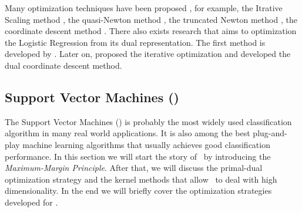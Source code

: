 {Many optimization techniques have been proposed \citep{Minka03}, for example, 
the {Itrative Scaling} method \citep{Darroch72,Pietra97inducing,Berger97,Goodman02Sequential,Jin03a},
the quasi-Newton method \citep{Minka03},
the truncated Newton method \citep{Komarek05making,Lin2008trust},
the coordinate descent method \citep{Huang09iterative}.
There also exists research that aims to optimization the Logistic Regression from its dual representation.
The first method is developed by \citet{Jaakkola99probabilistic}.
Later on, \citet{Keerthi05a} proposed the iterative optimization and \citet{Yu11dual} developed the dual coordinate descent method.




\iffalse
The key is to introduce a set of tighter upper bounds on (\ref{lr_posteriori_log}) that are parameterized by $\valpha$.
The bounds should have a simple form such that the maximizing (\ref{lr_posteriori_log}) over $\vw$ can be solved analytically with $\alpha$.
The solution to the original problem is transferred as finding the tighter upper bounds for  $\vw$, which is to minimize with respect to $\alpha$.
\iffalse
The dual form is given by 
\begin{align*}
	\underset{\valpha}{\minimize} & \quad\frac{1}{2}\sum_{i=1}^{m}\sum_{j=1}^{m}\valpha_iy_ix_ix_jy_j\valpha_j + \sum_{i=1}^{m}\left[\valpha_i\log\alpha_i+(\sigma^2-\valpha_i)\log(\sigma^2-\valpha_i)\right] \\
	\st &\quad 0\le\alpha\le\sigma^2, \, \forall i=\{1,\cdots,m\}.
\end{align*}
\fi
Later on, optimization algorithms that are based on dual form have been developed, for example iterative optimization method \citep{Keerthi05a} and the dual coordinate descent method \citep{Yu11dual}.
\fi


%
% 
\subsection{Support Vector Machines (\svm)}	\label{sc_svm}

The Support Vector Machines (\svm) is probably the most widely used classification algorithm in many real world applications.
It is also among the best plug-and-play machine learning algorithms that usually achieves good classification performance.
In this section we will start the story of \svm\ by introducing the \textit{Maximum-Margin Principle}.
After that, we will discuss the primal-dual optimization strategy and the kernel methods that allow \svm\ to deal with high dimensionality.
In the end we will briefly cover the optimization strategies developed for \svm.

}
